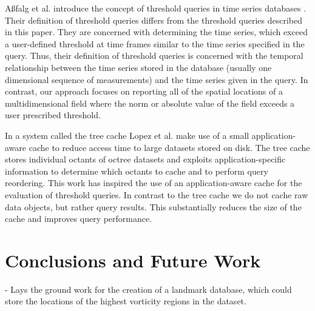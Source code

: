 \documentclass{sig-alternate}
\begin{document}
A{\ss}falg et al. introduce the concept of threshold queries in time series databases \cite{Asfalg}. Their definition of threshold queries differs from the threshold
queries described in this paper. They are concerned with determining the time series, which exceed a user-defined threshold at time frames similar to
the time series specified in the query. Thus, their definition of threshold queries is concerned with the temporal relationship between the time series
stored in the database (usually one dimensional sequence of measurements) and the time series given in the query. In contrast, our approach focuses on
reporting all of the spatial locations of a multidimensional field where the norm or absolute value of the field exceeds a user prescribed threshold.

In a system called the tree cache Lopez et al. \cite{Lopez} make use of a small application-aware cache to reduce access time to large datasets stored on
disk. The tree cache stores individual octants of octree datasets and exploits application-specific information to determine which octants to cache and to 
perform query reordering. This work has inspired the use of an application-aware cache for the evaluation of threshold queries. In contrast to the tree cache
we do not cache raw data objects, but rather query results. This substantially reduces the size of the cache and improves query performance.

\section{Conclusions and Future Work}

- Lays the ground work for the creation of a landmark database, which could store the locations of the highest vorticity regions in the dataset.

\end{document}
